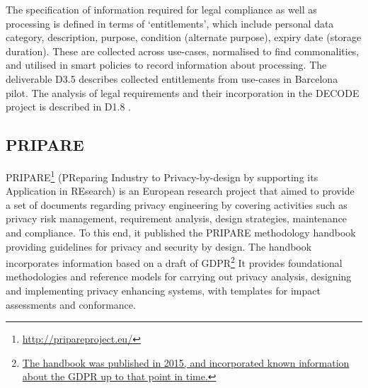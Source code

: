 The specification of information required for legal compliance as well as processing is defined in terms of `entitlements', which include personal data category, description, purpose, condition (alternate purpose), expiry date (storage duration). These are collected across use-cases, normalised to find commonalities, and utilised in smart policies to record information about processing. The deliverable D3.5 \cite{noauthor_decode_d3.5_initial_nodate} describes collected entitlements from use-cases in Barcelona pilot.
The analysis of legal requirements and their incorporation in the DECODE project is described in D1.8 \cite{noauthor_d1.8_legalframefordigcomm.pdf_nodate}.


\subsection{PRIPARE}
PRIPARE\footnote{\url{http://pripareproject.eu/}} (PReparing Industry to Privacy-by-design by supporting its Application in REsearch) is an European research project that aimed to provide a set of documents regarding privacy engineering by covering activities such as privacy risk management, requirement analysis, design strategies, maintenance and compliance. To this end, it published the PRIPARE methodology handbook \cite{noauthor_pripare-methodology-handbook-final-feb-24-2016.pdf_nodate} providing guidelines for privacy and security by design. The handbook incorporates information based on a draft of GDPR\footnote{\url{The handbook was published in 2015, and incorporated known information about the GDPR up to that point in time.}} It provides foundational methodologies and reference models for carrying out privacy analysis, designing and implementing privacy enhancing systems, with templates for impact assessments and conformance. 

